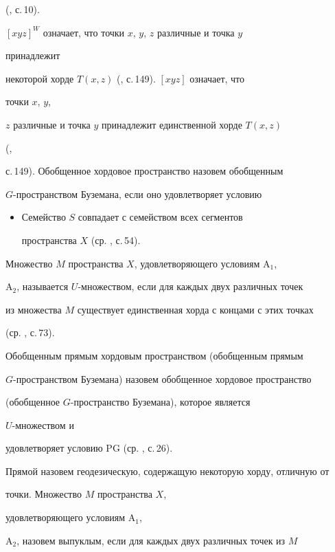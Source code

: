 (\cite{1}, с.\,10).\; 


$[xyz]^W$ означает, что точки $x$, $y$, $z$ различные и точка $y$ 


принадлежит 


некоторой хорде $T(x,z)$ (\cite{1}, с.\,149).\; $[xyz]$ означает, что 


точки $x$, $y$, 


$z$ различные и точка $y$ принадлежит единственной хорде $T(x,z)$ 


(\cite{1}, 


с.\,149). Обобщенное хордовое пространство назовем обобщенным 


$G$-пространством Буземана, если оно удовлетворяет условию 


\begin{itemize} 


\item[G.] Семейство $S$ совпадает с семейством всех сегментов 


пространства $X$ (ср. \cite{2}, с.\,54). 


\end{itemize} 


 


Множество $M$ пространства $X$, удовлетворяющего условиям A${}_1$, 


A${}_2$, называется $U$-мно\-же\-ством, если для каждых двух различных точек 


из множества $M$ существует единственная хорда с концами с этих точках 


(ср. \cite{1}, с.\,73). 


 


Обобщенным прямым хордовым пространством (обобщенным прямым 


$G$-пространством Буземана) назовем обобщенное хордовое пространство 


(обобщенное $G$-пространство Буземана), которое является 


$U$-множеством и 


удовлетворяет условию PG (ср. \cite{1}, с.\,26). 


 


Прямой назовем геодезическую, содержащую некоторую хорду, отличную от 


точки. Множество $M$ пространства $X$, 


удовлетворяющего условиям A${}_1$, 


A${}_2$, назовем выпуклым, если для каждых двух различных точек из $M$ 


